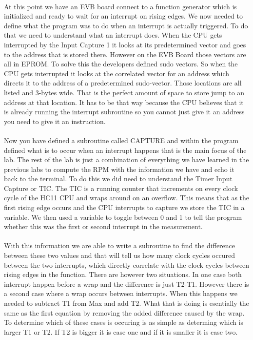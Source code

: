 \documentclass[12pt]{report}
\begin{document}
	\paragraph*{}
		At this point we have an EVB board connect to a function generator which is initialized and ready to wait for an interrupt on rising edges.  We now needed to define what the program was to do when an interrupt is actually triggered.  To do that we need to understand what an interrupt does.  When the CPU gets interrupted by the Input Capture 1 it looks at its predetermined vector and goes to the address that is stored there.  However on the EVB Board those vectors are all in EPROM.  To solve this the developers defined sudo vectors.  So when the CPU gets interrupted it looks at the correlated vector for an address which directs it to the address of a predetermined sudo-vector.  Those locations are all listed and 3-bytes wide.  That is the perfect amount of space to store jump to an address at that location.  It has to be that way because the CPU believes that it is already running the interrupt subroutine so you cannot just give it an address you need to give it an instruction.
	\paragraph*{}
		Now you have defined a subroutine called CAPTURE and within the program defined what is to occur when an interrupt happens that is the main focus of the lab.  The rest of the lab is just a combination of everything we have learned in the previous labs to compute the RPM with the information we have and echo it back to the terminal.  To do this we did need to understand the Timer Input Capture or TIC.  The TIC is a running counter that increments on every clock cycle of the HC11 CPU and wraps around on an overflow.  This means that as the first rising edge occurs and the CPU interrupts to capture we store the TIC in a variable.  We then used a variable to toggle between 0 and 1 to tell the program whether this was the first or second interrupt in the measurement.
	\paragraph*{}
		With this information we are able to write a subroutine to find the difference between these two values and that will tell us how many clock cycles occured between the two interrupts, which directly correlate with the clock cycles between rising edges in the function.  There are however two situations.  In one case both interrupt happen before a wrap and the difference is just T2-T1.  However there is a second case where a wrap occurs between interrupts.  When this happens we needed to subtract T1 from Max and add T2.  What that is doing is esentially the same as the first equation by removing the added difference caused by the wrap.  To determine which of these cases is occuring is as simple as determing which is larger T1 or T2.  If T2 is bigger it is case one and if it is smaller it is case two.
\end{document}
